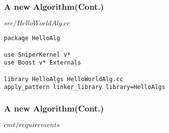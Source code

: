 \begin{frame}
    \frametitle{A new Algorithm(Cont.)}
    \begin{block}{\(src/HelloWorldAlg.cc\)}
        \par\usebox{\createalgimpl}
    \end{block}
\end{frame}

\newsavebox{\createalgcmt}
\begin{lrbox}{\createalgcmt}
\begin{lstlisting}
package HelloAlg

use SniperKernel v*
use Boost v* Externals

library HelloAlgs HelloWorldAlg.cc
apply_pattern linker_library library=HelloAlgs
\end{lstlisting}
\end{lrbox}

\begin{frame}
    \frametitle{A new Algorithm(Cont.)}
    \begin{block}{\(cmt/requirements\)}
        \par\usebox{\createalgcmt}
    \end{block}
\end{frame}
